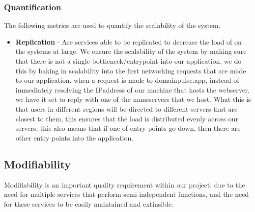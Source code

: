 \documentclass[12pt]{article}
\begin{document}
\subsubsection{Quantification}
The following metrics are used to quantify the scalability of the system.
\begin{itemize}
    \item \textbf{Replication} - Are services able to be replicated to decrease the load of on the systems at large.
          \newline We ensure the scalability of the system by making sure that there is not a single bottleneck/entrypoint into our application.
          \newline we do this by baking in scalability into the first networking requests that are made to our application. when a request is made to domainpulse.app, instead of immediately resolving the IPaddress of our machine that hosts the webserver,
          we have it set to reply with one of the nameservers that we host. What this is that users in different regions will be directed to different servers that are closest to them, this ensures that the load is distributed evenly across our servers.
          \newline this also means that if one of entry points go down, then there are other entry points into the application.
\end{itemize}
\newpage
\subsection{Modifiability}
Modifiability is an important quality requirement within our project, due to the need for multiple services that perform semi-independent functions, and the need for these services to be easily maintained and extinsible.
\end{document}
